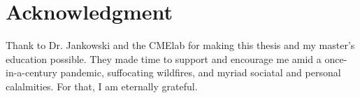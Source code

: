 \chapter*{Acknowledgment}

Thank to Dr. Jankowski and the CMElab for making this thesis and my master's education possible. They made
time to support and encourage me amid a once-in-a-century pandemic, suffocating wildfires, and myriad
sociatal and personal calalmities. For that, I am eternally grateful.
